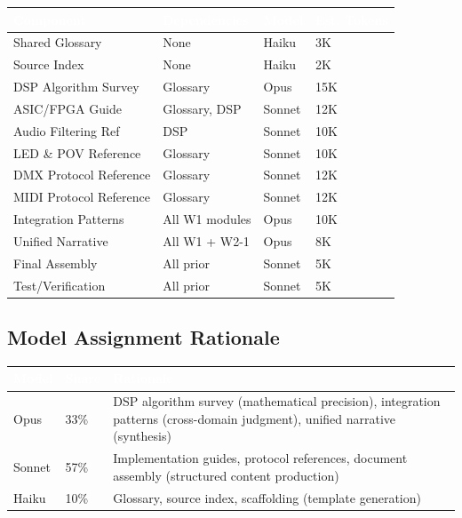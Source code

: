 \documentclass[11pt,letterpaper]{article}
\newcommand{\tableheader}[1]{\textbf{\sffamily\textcolor{white}{#1}}}
\begin{document}
\begin{center}
\begin{tabularx}{\textwidth}{L{3.2cm}L{2.2cm}C{1.5cm}C{1.8cm}}
\toprule
{}
\tableheader{Component} & \tableheader{Dependencies} & \tableheader{Model} & \tableheader{Est. Tokens} \\
\midrule
Shared Glossary & None & Haiku & 3K \\
Source Index & None & Haiku & 2K \\
DSP Algorithm Survey & Glossary & Opus & 15K \\
ASIC/FPGA Guide & Glossary, DSP & Sonnet & 12K \\
Audio Filtering Ref & DSP & Sonnet & 10K \\
LED \& POV Reference & Glossary & Sonnet & 10K \\
DMX Protocol Reference & Glossary & Sonnet & 12K \\
MIDI Protocol Reference & Glossary & Sonnet & 12K \\
Integration Patterns & All W1 modules & Opus & 10K \\
Unified Narrative & All W1 + W2-1 & Opus & 8K \\
Final Assembly & All prior & Sonnet & 5K \\
Test/Verification & All prior & Sonnet & 5K \\
\bottomrule
\end{tabularx}
\end{center}

\subsection{Model Assignment Rationale}

\begin{center}
\begin{tabularx}{\textwidth}{C{1.5cm}C{1.2cm}X}
\toprule
{}
\tableheader{Model} & \tableheader{Share} & \tableheader{Rationale} \\
\midrule
Opus & 33\% & DSP algorithm survey (mathematical precision), integration patterns (cross-domain judgment), unified narrative (synthesis) \\
Sonnet & 57\% & Implementation guides, protocol references, document assembly (structured content production) \\
Haiku & 10\% & Glossary, source index, scaffolding (template generation) \\
\bottomrule
\end{tabularx}
\end{center}
\end{document}
